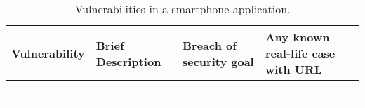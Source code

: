 \documentclass[11pt,letterpaper]{article}
\begin{document}
\begin{table}[htbp]
    \caption{Vulnerabilities in a smartphone application.
    }
    \begin{tabularx}{\columnwidth}{|X|X|p{3cm}|X|}
        \hline
        \textbf{Vulnerability} & \textbf{Brief Description} & \textbf{Breach of security goal} & \textbf{Any known real-life case with URL}\\
        
        \hline
        & 
        &
        &
        \\ \hline
        
        & 
        &
        &
        \\ \hline
        
        &
        &
        &
        \\\hline
        
        &
        &
        &
        \\\hline
        
        &
        &
        &
        \\\hline
    \end{tabularx}
\end{table}


\end{document}
